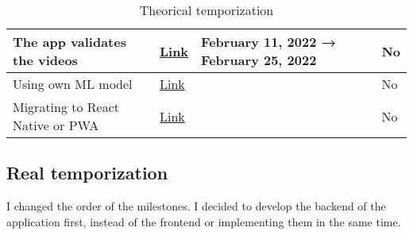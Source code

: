 \begin{table}[H]
{\begin{tabular}{|l|l|l|l|}
        \hline           The app validates the videos        &    \href{https://github.com/JesusGonzalezA/LearnASL/milestone/5}{Link}      &    February 11, 2022   →   February 25, 2022     &       No      \\
        \hline           Using own ML model                  &    \href{https://github.com/JesusGonzalezA/LearnASL/milestone/10}{Link}     &                                                  &       No      \\
        \hline           Migrating to React Native or PWA    &    \href{https://github.com/JesusGonzalezA/LearnASL/milestone/9}{Link}      &                                                  &       No      \\
        \hline
    \end{tabular}
    }
\caption{Theorical temporization}
\label{table:planification_theorical_temporization}
\end{table}

\subsection{Real temporization}
I changed the order of the milestones. I decided to develop the backend of the application first, instead of the frontend or implementing them in the same time. \\

